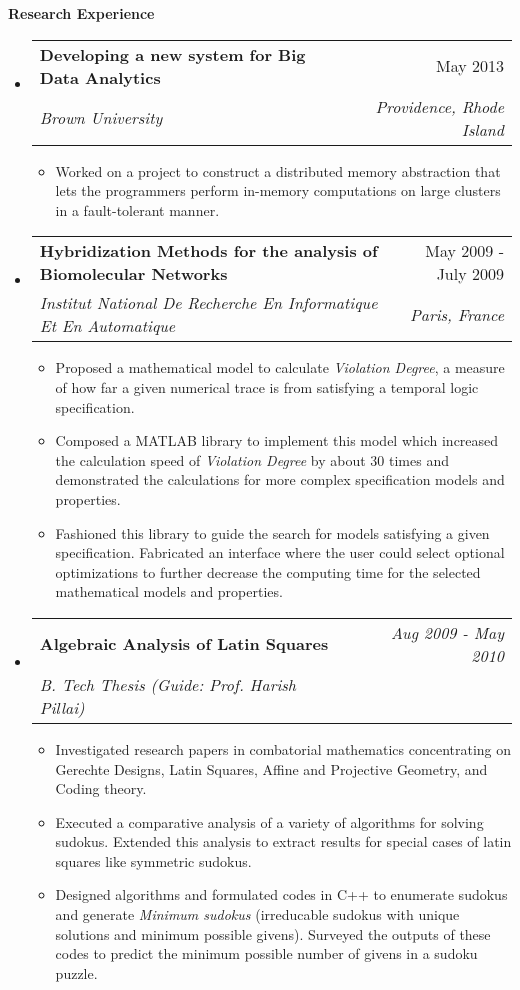 \documentclass[letterpaper,11pt]{article}
\makeatletter
\newcommand{\resitem}[1]{\item[\ding{226}] #1 \vspace{-2pt}}
\newcommand{\resheading}[1]{{\large \colorbox{mygrey}{\begin{minipage}{\textwidth}{\textbf{#1 \vphantom{p\^{E}}}}\end{minipage}}}}
\newcommand{\ressubheading}[4]{
\begin{tabular*}{7.0in}{l@{\extracolsep{\fill}}r}
		\textbf{#1} & #2 \\
		\textit{#3} & \textit{#4} \\
\end{tabular*}\vspace{-6pt}}
\makeatother
\begin{document}
\resheading{Research Experience}
\begin{itemize}
\item
	\ressubheading{Developing a new system for Big Data Analytics}{May 2013}{Brown University}{Providence, Rhode Island}
	\begin{itemize}
		\resitem{Worked on a project to construct a distributed memory abstraction that lets the programmers perform in-memory computations on large clusters in a fault-tolerant manner.}
	\end{itemize}

\item
	\ressubheading{Hybridization Methods for the analysis of Biomolecular Networks}{May 2009 - July 2009}{Institut National De Recherche En Informatique Et En Automatique}{Paris, France}
	\begin{itemize}
		\resitem{Proposed a mathematical model to calculate \textit{Violation Degree}, a measure of how far a given numerical trace is from satisfying a temporal logic specification. }
        \resitem{Composed a MATLAB library to implement this model which increased the calculation speed of \textit{Violation Degree} by about 30 times and demonstrated the calculations for more complex specification models and properties.}
        \resitem{Fashioned this library to guide the search for models satisfying a given specification. Fabricated an interface where the user could select optional optimizations to further decrease the computing time for the selected mathematical models and properties.}
	\end{itemize}

\item
	\ressubheading{Algebraic Analysis of Latin Squares}{\textit{Aug 2009 - May 2010}}{B. Tech Thesis (Guide: Prof. Harish Pillai)}{}
	\begin{itemize}
        \resitem{Investigated research papers in combatorial mathematics concentrating on Gerechte Designs, Latin Squares, Affine and Projective Geometry, and Coding theory.}
        \resitem{Executed a comparative analysis of a variety of algorithms for solving sudokus. Extended this analysis to extract results for special cases of latin squares like symmetric sudokus.}
        \resitem{Designed algorithms and formulated codes in C++ to enumerate sudokus and generate \textit{Minimum sudokus} (irreducable sudokus with unique solutions and minimum possible givens). Surveyed the outputs of these codes to predict the minimum possible number of givens in a sudoku puzzle.}
	\end{itemize}

\end{itemize}
\end{document}

